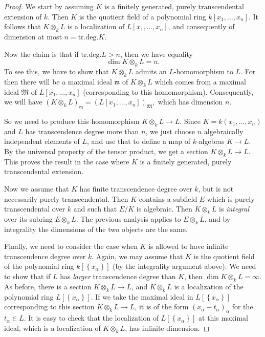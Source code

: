 \begin{proof} 
We start by assuming $K$ is a finitely generated, purely transcendental extension of $k$.
Then $K $ is the quotient field of a polynomial ring $k[x_1, \dots, x_n]$.
It follows that $K \otimes_k L$ is a localization of $L[x_1, \dots, x_n]$, and
consequently of dimension at most $n = \mathrm{tr.deg.} K$.

Now the claim is that if $\mathrm{tr.deg.} L > n$, then we have equality
\[ \dim K \otimes_k L = n.  \]
To see this, we have to show that $K \otimes_k L$ admits an $L$-homomorphism to
$L$. For then there will be a maximal ideal $\mathfrak{m}$ of $K \otimes_k L$ which comes from
a maximal ideal $\mathfrak{M}$ of $L[x_1, \dots, x_n]$ (corresponding to this
homomorphism). Consequently, we will have $(K \otimes_k L)_{\mathfrak{m}}  =
(L[x_1, \dots, x_n])_{\mathfrak{M}},$ which has dimension $n$.

So we need to produce this homomorphism $K \otimes_k L \to L$. Since $K =
k(x_1, \dots, x_n)$ and $L$ has transcendence degree more than $n$, we just choose $n$ 
algebraically independent elements of $L$, and use that to define a map of
$k$-algebras $K \to L$. By the universal property of the tensor product, we get
a section $K \otimes_k L \to L$.
This proves the result in the case where $K$ is a finitely generated, purely
transcendental extension.

Now we assume that $K$ has 
finite transcendence degree over $k$, but is not necessarily purely
transcendental. Then $K$ contains a subfield $E$ which is purely transcendental
over $k$ and such that $E/K$ is algebraic. Then $K \otimes_k L$ is
\emph{integral} over its subring $E \otimes_k L$. The previous analysis applies
to $E \otimes_k L$, and by integrality the dimensions of the two objects are
the same.

Finally, we need to consider the case when $K$ is allowed to have infinite
transcendence degree over $k$. Again, we may assume that $K$ is the quotient
field of the polynomial ring $k[\left\{x_\alpha\right\}]$ (by the integrality
argument above). 
We need to show that if $L$ has \emph{larger} transcendence degree than $K$,
then $\dim K \otimes_k L = \infty$. As before, there is a section $K \otimes_k
L \to L$, and $K \otimes_k L$ is a localization of  the
polynomial ring $L[\left\{x_\alpha\right\}]$.
If we take the maximal ideal in $L[\left\{x_\alpha\right\}]$ corresponding to
this section $K \otimes_k L \to L$, it is of the form $(x_\alpha -
t_\alpha)_\alpha$
for the $t_\alpha \in L$. It is easy to check that the localization of
$L[\left\{x_\alpha\right\}]$ at this maximal ideal, which is a localization of
$K \otimes_k L$, has infinite dimension.
\end{proof} 


